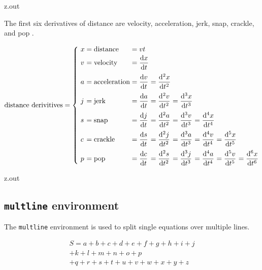 \begin{VerbatimOut}{z.out}

The first six derivatives of distance are velocity, acceleration, jerk, snap, crackle,
and pop
\cite{reid2013}.

\begin{equation}
  \AtBeginEnvironment{array}{\everymath{\displaystyle}}
  \arraycolsep = 0pt
  \text{distance derivitives} = \left\{\ %
    \begin{array}{llllllll}
      x&      {}=\text{distance}&     {}=vt\\[2pt]
      v&      {}=\text{velocity}&     {}=\frac{\di x}{\di t}\\[9pt]
      a&      {}=\text{acceleration}& {}=\frac{\di v}{\di t}& {}=\frac{\di^2x}{\di t^2}\\[9pt]
      \mit j& {}=\text{jerk}&         {}=\frac{\di a}{\di t}& {}=\frac{\di^2v}{\di t^2}&
        {}=\frac{\di^3x}{\di t^3}\\[9pt]
      s
        & {}=\text{snap}
        & {}=\frac{\di \mit j}{\di t}
        & {}=\frac{\di^2a}{\di t^2}
        & {}=\frac{\di^3v}{\di t^3}
        & {}=\frac{\di^4x}{\di t^4}\\[9pt]
      c
        & {}=\text{crackle}
        & {}=\frac{\di s}{\di t}
        & {}=\frac{\di^2\mit j}{\di t^2}
        & {}=\frac{\di^3a}{\di t^3}
        & {}=\frac{\di^4v}{\di t^4}
        & {}=\frac{\di^5x}{\di t^5}\\[9pt]
      p
        & {}=\text{pop}
        & {}=\frac{\di c}{\di t}
        & {}=\frac{\di^2s}{\di t^2}
        & {}=\frac{\di^3\mit j}{\di t^3}
        & {}=\frac{\di^4a}{\di t^4}
        & {}=\frac{\di^5v}{\di t^5}
        & {}=\frac{\di^6x}{\di t^6}
    \end{array}
  \right.
\end{equation}
\end{VerbatimOut}

\MyIO


\begin{VerbatimOut}{z.out}

\subsection{\texttt{multline} environment}

The \verb+multline+ environment is used
to split single equations over multiple lines.

\begin{multline}
  S = a + b + c + d + e + f + g + h + i + j\\
  + k + l + m + n + o + p\\
  + q + r + s + t + u + v + w + x + y + z
\end{multline}
\end{VerbatimOut}

